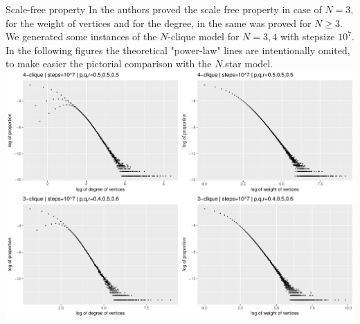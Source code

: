 \begin{block}{Scale-free property}
\small
In \cite{BaMo} the authors proved the scale free property in case of $N=3$, for 
the weight of vertices and for the degree, in \cite{FaPo} the same was proved for 
$N\ge 3.$ We generated some instances of the $N$-clique model for $N=3,4$ with stepsize 
$10^7$. In the following figures the theoretical "power-law" lines are intentionally omited, 
to make easier the pictorial comparison with the $N$.star model.
{
\centering
\includegraphics[width=0.8\linewidth]{./fig/klikkdist4v.pdf}
}
\end{block}

